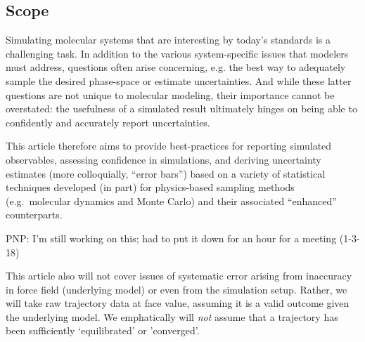 \subsection{Scope}

Simulating molecular systems that are interesting by today's standards is a challenging task.  In addition to the various system-specific issues that modelers must address, questions often arise concerning, e.g. the best way to adequately sample the desired phase-space or estimate uncertainties.  And while these latter questions are not unique to molecular modeling, their importance cannot be overstated: the usefulness of a simulated result ultimately hinges on being able to confidently and accurately report uncertainties.  

This article therefore aims to provide best-practices for reporting simulated observables, assessing confidence in simulations, and deriving uncertainty estimates (more colloquially, ``error bars'') based on a variety of statistical techniques developed (in part) for physics-based sampling methods (e.g.\ molecular dynamics and Monte Carlo) and their associated ``enhanced'' counterparts.  

PNP: I'm still working on this; had to put it down for an hour for a meeting (1-3-18)



This article also will not cover issues of systematic error arising from inaccuracy in force field (underlying model) or even from the simulation setup.
Rather, we will take raw trajectory data at face value, assuming it is a valid outcome given the underlying model.
We emphatically will \emph{not} assume that a trajectory has been sufficiently `equilibrated' or 'converged'.

